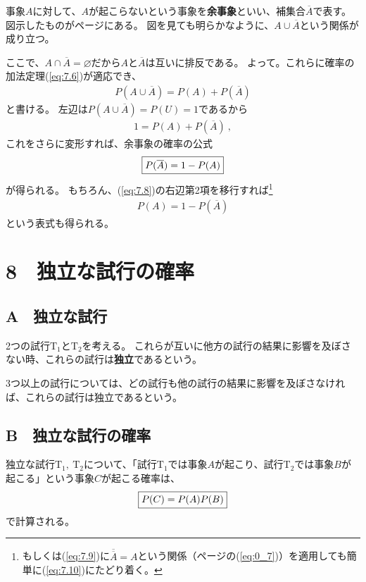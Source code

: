 \documentclass[luatexja,fontsize=12pt]{jlreq}\usepackage{ifthen}\newcounter{enlarge}\setcounter{enlarge}{1}
\begin{document}
事象$A$に対して、$A$が起こらないという事象を\textbf{余事象}といい、補集合$\overline{A}$で表す。
図示したものが\pageref{f:0.1}ページにある。
図を見ても明らかなように、$A \cup \overline{A} $という関係が成り立つ。

ここで、$A \cap \overline{A} = \varnothing $だから$A$と$\overline{A} $は互いに排反である。
よって。これらに確率の加法定理(\ref{eq:7.6})が適応でき、
\begin{align} \label{eq:7.7}
P(A \cup \overline{A} ) = P(A) + P(\overline{A})
\end{align}
と書ける。
左辺は$P(A \cup \overline{A} ) = P(U) = 1$であるから
\begin{align} \label{eq:7.8}
1 = P(A) + P(\overline{A}) ~,
\end{align}
これをさらに変形すれば、余事象の確率の公式
\begin{align} 
\fbox{$
P(\overline{A}) =  1 - P(A) \label{eq:7.9}
$}
\end{align}
が得られる。
もちろん、(\ref{eq:7.8})の右辺第2項を移行すれば\footnote{%
もしくは(\ref{eq:7.9})に$\overline{\overline{A}} = A$という関係（\pageref{eq:0_7}ページの(\ref{eq:0_7})）を適用しても簡単に(\ref{eq:7.10})にたどり着く。
}
\begin{align} 
P(A) =  1 - P(\overline{A}) \label{eq:7.10}
\end{align}
という表式も得られる。

\section*{8　独立な試行の確率}

\subsection*{A　独立な試行}

2つの試行$\mathrm{T}_1 $と$\mathrm{T}_2 $を考える。
これらが互いに他方の試行の結果に影響を及ぼさない時、これらの試行は\textbf{独立}であるという。

3つ以上の試行については、どの試行も他の試行の結果に影響を及ぼさなければ、これらの試行は独立であるという。

\subsection*{B　独立な試行の確率}

独立な試行$\mathrm{T}_1 ,~ \mathrm{T}_2 $について、「試行$\mathrm{T}_1 $では事象$A$が起こり、試行$\mathrm{T}_2 $では事象$B$が起こる」という事象$C$が起こる確率は、
\begin{align}
\fbox{$
P(C) = P(A) P(B) \label{eq:8.1}
$}
\end{align}
で計算される。
\end{document}
